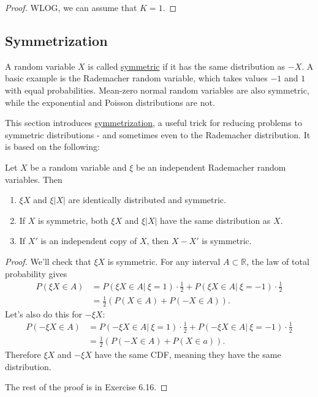 \begin{proof}
WLOG, we can assume that $K = 1$.
\end{proof}


\subsection{Symmetrization}
A random variable $X$ is called \underline{symmetric} if it has the same distribution as $-X$. A basic example 
is the Rademacher random variable, which takes values $-1$ and $1$ with equal probabilities. Mean-zero normal 
random variables are also symmetric, while the exponential and Poisson distributions are not.

This section introduces \underline{symmetrization}, a useful trick for reducing problems to symmetric 
distributions - and sometimes even to the Rademacher distribution. It is based on the following:

\begin{lemma}
\label{lem:6.3.1}
Let $X$ be a random variable and $\xi$ be an independent Rademacher random variables. Then 
\begin{enumerate}
	\item $\xi X$ and $\xi |X|$ are identically distributed and symmetric.
	\item If $X$ is symmetric, both $\xi X$ and $\xi |X|$ have the same distribution as $X$. 
	\item If $X'$ is an independent copy of $X$, then $X - X'$ is symmetric.
\end{enumerate}
\end{lemma}

\begin{proof}
We'll check that $\xi X$ is symmetric. For any interval $A \subset \mathbb{R}$, the law of total probability 
gives 
\begin{align*}
	P(\xi X \in A) 
	&= P(\xi X \in A | \ \xi = 1) \cdot \frac{1}{2} + P(\xi X \in A | \ \xi = -1) \cdot \frac{1}{2} \\
	&= \frac{1}{2}(P(X \in A) + P(-X \in A)).
\end{align*}
Let's also do this for $-\xi X$: 
\begin{align*}
	P(-\xi X \in A) 
	&= P(-\xi X \in A | \ \xi = 1) \cdot \frac{1}{2} + P(-\xi X \in A | \ \xi = -1) \cdot \frac{1}{2} \\
	&= \frac{1}{2}(P(-X \in A) + P(X \in a)).
\end{align*}
Therefore $\xi X$ and $-\xi X$ have the same CDF, meaning they have the same distribution.

The rest of the proof is in Exercise 6.16.
\end{proof}

